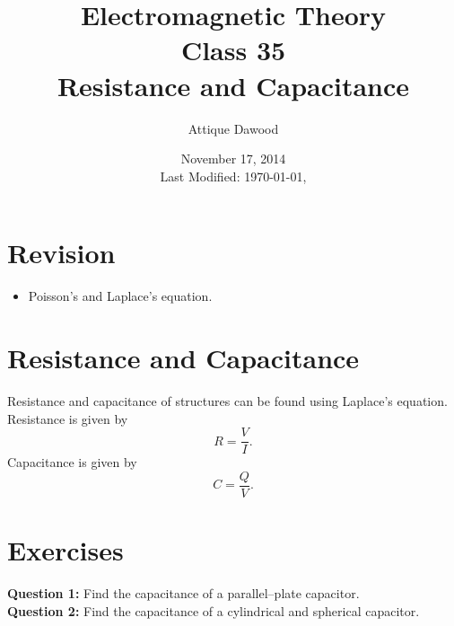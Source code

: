 \documentclass[12pt,a4paper]{article}
\title{Electromagnetic Theory\\Class 35\\Resistance and Capacitance}
\author{Attique Dawood}
\date{November 17, 2014\\[0.2cm] Last Modified: \today, \currenttime}
\begin{document}
\maketitle
\section{Revision}
\begin{itemize}
\item Poisson's and Laplace's equation.
\end{itemize}
\section{Resistance and Capacitance}
Resistance and capacitance of structures can be found using Laplace's equation. Resistance is given by
\begin{equation}
R=\dfrac{V}{I}.
\end{equation}
Capacitance is given by
\begin{equation}
C=\dfrac{Q}{V}.
\end{equation}
\section{Exercises}
\noindent\textbf{Question 1:} Find the capacitance of a parallel--plate capacitor.\\[0.2cm]
\noindent\textbf{Question 2:} Find the capacitance of a cylindrical and spherical capacitor.
%
%
\end{document}
